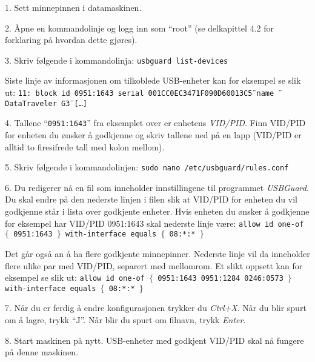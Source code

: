 \item{1.} Sett minnepinnen i datamaskinen.
\item{2.} \AA pne en kommandolinje og logg inn som ``root'' (se delkapittel 4.2 for forklaring p\aa{} hvordan dette gj\o res).
\item{3.} Skriv f\o lgende i kommandolinja:
\medskip
{\tt usbguard list-devices}
\medskip
\item{} Siste linje av informasjonen om tilkoblede USB-enheter kan for eksempel se slik ut:
\medskip
{\tt 11: block id 0951:1643 serial \"{}001CC0EC3471F090D60013C5\"{} name \"{}DataTraveler G3\"{} [\dots]}
\medskip
\item{4.} Tallene ``{\tt 0951:1643}'' fra eksemplet over er enhetens {\it VID/PID}. Finn VID/PID for enheten du \o nsker \aa{} godkjenne og skriv tallene ned p\aa{} en lapp (VID/PID er alltid to firesifrede tall med kolon mellom).
\item{5.} Skriv f\o lgende i kommandolinjen:
\medskip
{\tt sudo nano /etc/usbguard/rules.conf}
\medskip
\item{6.} Du redigerer n\aa{} en fil som inneholder innstillingene til programmet {\it USBGuard}. Du skal endre p\aa{} den nederste linjen i filen slik at VID/PID for enheten du vil godkjenne st\aa r i lista over godkjente enheter. Hvis enheten du \o nsker \aa{} godkjenne for eksempel har VID/PID 0951:1643 skal nederste linje v\ae re:
\medskip
{\tt allow id one-of $\{$ 0951:1643 $\}$ with-interface equals $\{$ 08:*:* $\}$ }
\medskip
\item{} Det g\aa r ogs\aa{} an \aa{} ha flere godkjente minnepinner. Nederste linje vil da inneholder flere ulike par med VID/PID, separert med mellomrom. Et slikt oppsett kan for eksempel se slik ut:
\medskip
{\tt allow id one-of $\{$ 0951:1643 0951:1284 0246:0573 $\}$ with-interface equals $\{$ 08:*:* $\}$ }
\medskip
\item{7.} N\aa r du er ferdig \aa{} endre konfigurasjonen trykker du {\it Ctrl+X}. N\aa r du blir spurt om \aa{} lagre, trykk ``J''. N\aa r blir du spurt om filnavn, trykk {\it Enter}.

\item{8.} Start maskinen p\aa{} nytt. USB-enheter med godkjent VID/PID skal n\aa{} fungere p\aa{} denne maskinen.

\vfill\eject



